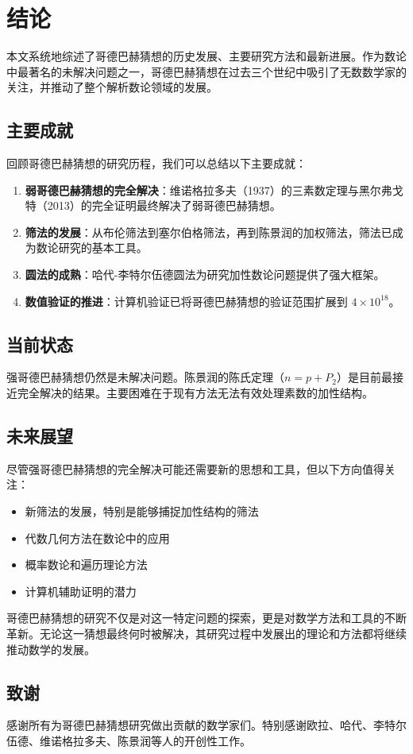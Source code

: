 \section{结论}\label{sec:conclusion}

本文系统地综述了哥德巴赫猜想的历史发展、主要研究方法和最新进展。作为数论中最著名的未解决问题之一，哥德巴赫猜想在过去三个世纪中吸引了无数数学家的关注，并推动了整个解析数论领域的发展。

\subsection{主要成就}

回顾哥德巴赫猜想的研究历程，我们可以总结以下主要成就：

\begin{enumerate}
    \item \textbf{弱哥德巴赫猜想的完全解决}：维诺格拉多夫（1937）的三素数定理与黑尔弗戈特（2013）的完全证明最终解决了弱哥德巴赫猜想。
    \item \textbf{筛法的发展}：从布伦筛法到塞尔伯格筛法，再到陈景润的加权筛法，筛法已成为数论研究的基本工具。
    \item \textbf{圆法的成熟}：哈代-李特尔伍德圆法为研究加性数论问题提供了强大框架。
    \item \textbf{数值验证的推进}：计算机验证已将哥德巴赫猜想的验证范围扩展到 $4 \times 10^{18}$。
\end{enumerate}

\subsection{当前状态}

强哥德巴赫猜想仍然是未解决问题。陈景润的陈氏定理（$n = p + P_2$）是目前最接近完全解决的结果。主要困难在于现有方法无法有效处理素数的加性结构。

\subsection{未来展望}

尽管强哥德巴赫猜想的完全解决可能还需要新的思想和工具，但以下方向值得关注：

\begin{itemize}
    \item 新筛法的发展，特别是能够捕捉加性结构的筛法
    \item 代数几何方法在数论中的应用
    \item 概率数论和遍历理论方法
    \item 计算机辅助证明的潜力
\end{itemize}

哥德巴赫猜想的研究不仅是对这一特定问题的探索，更是对数学方法和工具的不断革新。无论这一猜想最终何时被解决，其研究过程中发展出的理论和方法都将继续推动数学的发展。

\subsection{致谢}

感谢所有为哥德巴赫猜想研究做出贡献的数学家们。特别感谢欧拉、哈代、李特尔伍德、维诺格拉多夫、陈景润等人的开创性工作。
